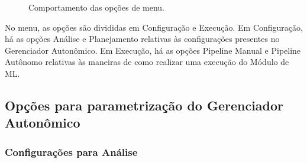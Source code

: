 \documentclass[portugues]{ic-tese}
\begin{document}
\begin{figure}[H]
    \centering
    \caption{Comportamento das opções de menu.}
    \label{fig:opcoesMenu}
\end{figure}

No menu, as opções são divididas em Configuração e Execução. Em Configuração, há as opções Análise e Planejamento relativas às configurações presentes no Gerenciador Autonômico. Em Execução, há as opções Pipeline Manual e Pipeline Autônomo relativas às maneiras de como realizar uma execução do Módulo de ML.

\subsection{Opções para parametrização do Gerenciador Autonômico}

\subsubsection{Configurações para Análise}
\end{document}
